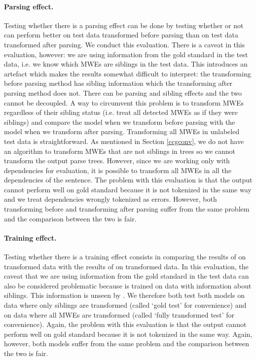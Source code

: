 \documentclass[output=paper]{LSP/langsci}
\begin{document}
    \paragraph*{Parsing effect.}
    Testing whether there is a parsing effect can be done by testing whether or not \modelA can perform better on test data transformed before parsing than on test data transformed after parsing. We conduct this evaluation. There is a caveat in this evaluation, however: we are using information from the gold standard in the test data, i.e. we know which MWEs are siblings in the test data. This introduces an artefact which makes the results somewhat difficult to interpret: the transforming before parsing method has sibling information which the transforming after parsing method does not. There can be parsing and sibling effects and the two cannot be decoupled. A way to circumvent this problem is to transform MWEs regardless of their sibling status (i.e. treat all detected MWEs as if they were siblings) and compare the model when we transform before parsing with the model when we transform after parsing. Transforming all MWEs in unlabeled test data is straightforward. As mentioned in Section \ref{ccgconv}, we do not have an algorithm to transform MWEs that are not siblings in trees so we cannot transform the output parse trees. However, since we are working only with dependencies for evaluation, it is possible to transform all MWEs in all the dependencies of the sentence. The problem with this evaluation is that the output cannot perform well on gold standard because it is not tokenized in the same way and we treat dependencies wrongly tokenized as errors. However, both transforming before and transforming after parsing suffer from the same problem and the comparison between the two is fair. 
    \paragraph*{Training effect.}
    Testing whether there is a training effect consists in comparing the results of \modelA on transformed data with the results of \modelB on transformed data. In this evaluation, the caveat that we are using information from the gold standard in the test data can also be considered problematic because \modelB is trained on data with information about siblings. This information is unseen by \modelA. We therefore both test both models on data where only siblings are transformed (called `gold test' for convenience) and on data where all MWEs are transformed (called `fully transformed test' for convenience). Again, the problem with this evaluation is that the output cannot perform well on gold standard because it is not tokenized in the same way. Again, however, both models suffer from the same problem and the comparison between the two is fair.
\end{document}
